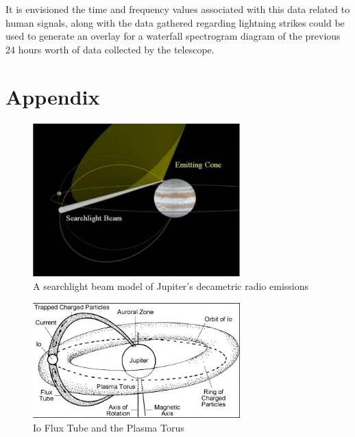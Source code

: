 \documentclass[runningheads,a4paper]{llncs}
\begin{document}
It is envisioned the time and frequency values associated with this data related to human signals, along with the data gathered regarding lightning strikes could be used to generate an overlay for a waterfall spectrogram diagram of the previous 24 hours worth of data collected by the telescope.


%
\appendix
\chapter*{Appendix}

%
\begin{figure}[here]
\centering
\includegraphics[width=8cm]{images/12}
\caption{A searchlight beam model of Jupiter's decametric radio emissions \citep{imai-08}}
\label{fig:decametric_emissions_searchlight}
\end{figure}
%

%
\begin{figure}[here]
\centering
\includegraphics[width=8cm]{images/13}
\caption{Io Flux Tube and the Plasma Torus \citep{lang-10}}
\label{fig:io_flux_tube_plasma_torus}
\end{figure}
%
\end{document}
